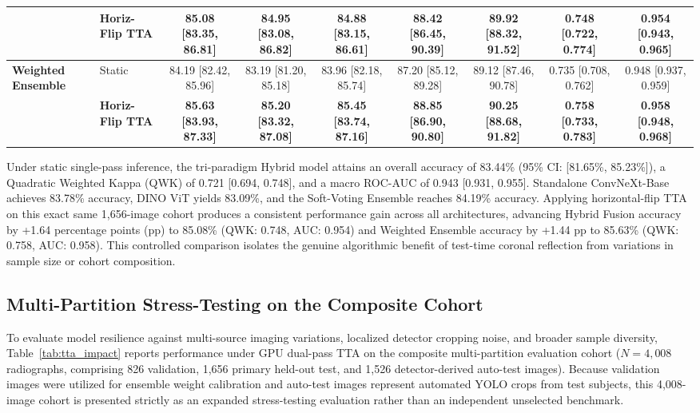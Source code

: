 \documentclass[10pt,journal]{IEEEtran}
\begin{document}
\begin{table}[t]
{\begin{tabular}{llccccccc}
& \textbf{Horiz-Flip TTA} & \textbf{85.08 [83.35, 86.81]} & \textbf{84.95 [83.08, 86.82]} & \textbf{84.88 [83.15, 86.61]} & \textbf{88.42 [86.45, 90.39]} & \textbf{89.92 [88.32, 91.52]} & \textbf{0.748 [0.722, 0.774]} & \textbf{0.954 [0.943, 0.965]} \\
\midrule
\multirow{2}{*}{\textbf{Weighted Ensemble}} 
& Static & 84.19 [82.42, 85.96] & 83.19 [81.20, 85.18] & 83.96 [82.18, 85.74] & 87.20 [85.12, 89.28] & 89.12 [87.46, 90.78] & 0.735 [0.708, 0.762] & 0.948 [0.937, 0.959] \\
& \textbf{Horiz-Flip TTA} & \textbf{85.63 [83.93, 87.33]} & \textbf{85.20 [83.32, 87.08]} & \textbf{85.45 [83.74, 87.16]} & \textbf{88.85 [86.90, 90.80]} & \textbf{90.25 [88.68, 91.82]} & \textbf{0.758 [0.733, 0.783]} & \textbf{0.958 [0.948, 0.968]} \\
\bottomrule
\end{tabular}%
}
\end{table}

Under static single-pass inference, the tri-paradigm Hybrid model attains an overall accuracy of 83.44\% (95\% CI: [81.65\%, 85.23\%]), a Quadratic Weighted Kappa (QWK) of 0.721 [0.694, 0.748], and a macro ROC-AUC of 0.943 [0.931, 0.955]. Standalone ConvNeXt-Base achieves 83.78\% accuracy, DINO ViT yields 83.09\%, and the Soft-Voting Ensemble reaches 84.19\% accuracy. Applying horizontal-flip TTA on this exact same 1,656-image cohort produces a consistent performance gain across all architectures, advancing Hybrid Fusion accuracy by +1.64 percentage points (pp) to 85.08\% (QWK: 0.748, AUC: 0.954) and Weighted Ensemble accuracy by +1.44 pp to 85.63\% (QWK: 0.758, AUC: 0.958). This controlled comparison isolates the genuine algorithmic benefit of test-time coronal reflection from variations in sample size or cohort composition.

\subsection{Multi-Partition Stress-Testing on the Composite Cohort}
\label{subsec:tta_impact}

To evaluate model resilience against multi-source imaging variations, localized detector cropping noise, and broader sample diversity, Table~\ref{tab:tta_impact} reports performance under GPU dual-pass TTA on the composite multi-partition evaluation cohort ($N = 4{,}008$ radiographs, comprising 826 validation, 1,656 primary held-out test, and 1,526 detector-derived auto-test images). Because validation images were utilized for ensemble weight calibration and auto-test images represent automated YOLO crops from test subjects, this 4,008-image cohort is presented strictly as an expanded stress-testing evaluation rather than an independent unselected benchmark.
\end{document}
